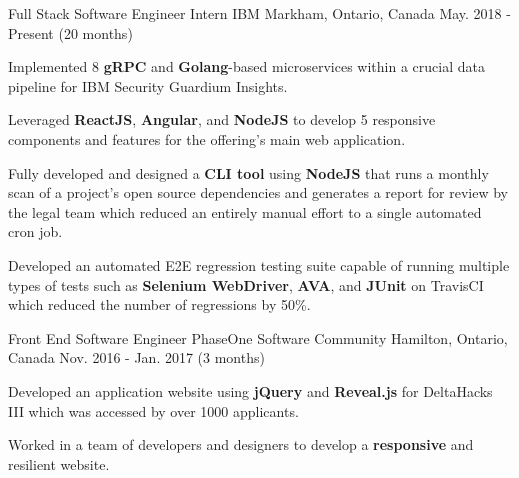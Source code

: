 


\begin{cventries}


\cventry
{Full Stack Software Engineer Intern} %
{IBM} %
{Markham, Ontario, Canada} %
{May. 2018 - Present (20 months)} %
{ %
\begin{cvitems}
\item {Implemented 8 \textbf{gRPC} and \textbf{Golang}-based microservices within a crucial data pipeline for IBM Security Guardium Insights.}
\item {Leveraged \textbf{ReactJS}, \textbf{Angular}, and \textbf{NodeJS} to develop 5 responsive components and features for the offering's main web application.}
\item {Fully developed and designed a \textbf{CLI tool} using \textbf{NodeJS} that runs a monthly scan of a project's open source dependencies and generates a report for review by the legal team which reduced an entirely manual effort to a single automated cron job.}
\item {Developed an automated E2E regression testing suite capable of running multiple types of tests such as \textbf{Selenium WebDriver}, \textbf{AVA}, and \textbf{JUnit} on TravisCI which reduced the number of regressions by 50\%.}
\end{cvitems}
}


\cventry
{Front End Software Engineer} %
{PhaseOne Software Community} %
{Hamilton, Ontario, Canada} %
{Nov. 2016 - Jan. 2017 (3 months)} %
{ %
\begin{cvitems}
\item {Developed an application website using \textbf{jQuery} and \textbf{Reveal.js} for DeltaHacks III which was accessed by over 1000 applicants.}
\item {Worked in a team of developers and designers to develop a \textbf{responsive} and resilient website.}
\end{cvitems}
}


\end{cventries}